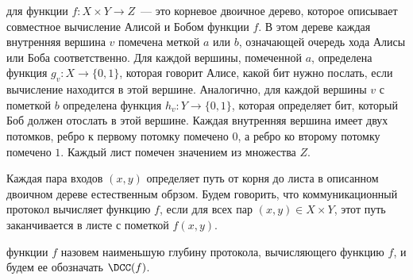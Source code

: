 
\begin{definition*}
     для функции $f\colon X \times Y \to Z$~--- это корневое двоичное
    дерево, которое описывает совместное вычисление Алисой и Бобом функции $f$. В этом дереве каждая
    внутренняя вершина $v$ помечена меткой $a$ или $b$, означающей очередь хода Алисы или Боба
    соответственно. Для каждой вершины, помеченной $a$, определена функция $g_v\colon X \to \{0, 1\}$, которая
    говорит Алисе, какой бит нужно послать, если вычисление находится в этой вершине. Аналогично, для
    каждой вершины $v$ с пометкой $b$ определена функция $h_v\colon Y \to \{0, 1\}$, которая определяет бит,
    который Боб должен отослать в этой вершине. Каждая внутренняя вершина имеет двух потомков, ребро к
    первому потомку помечено $0$, а ребро ко второму потомку помечено $1$. Каждый лист помечен значением
    из множества $Z$.

    Каждая пара входов $(x, y)$ определяет путь от корня до листа в описанном двоичном дереве
    естественным обрзом. Будем говорить, что коммуникационный протокол вычисляет функцию $f$, если для
    всех пар $(x, y) \in X \times Y$, этот путь заканчивается в листе с пометкой $f(x, y)$.

     функции $f$ назовем наименьшую глубину протокола, вычисляющего
    функцию $f$, и будем ее обозначать $\DCC(f)$.
\end{definition*}


\breakline







